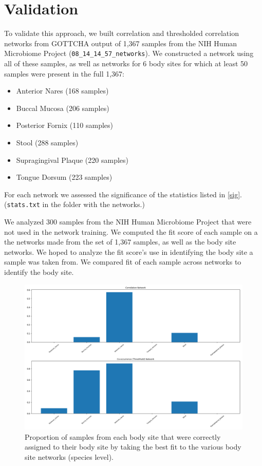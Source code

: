 \documentclass[10pt]{article}
\theoremstyle{definition}
\numberwithin{theorem}{section}
\numberwithin{definition}{section}
\numberwithin{lemma}{section}
\numberwithin{corollary}{section}
\numberwithin{clm}{section}
\numberwithin{rmk}{section}
\begin{document}
\section{Validation}

To validate this approach, we built correlation and thresholded correlation networks from GOTTCHA output of 1,367 samples from the NIH Human Microbiome Project (\verb|08_14_14_57_networks|). We constructed a network using all of these samples, as well as networks for 6 body sites for which at least 50 samples were present in the full 1,367:
\begin{itemize}
	\item Anterior Nares (168 samples) 
	\item Buccal Mucosa (206 samples)
	\item Posterior Fornix (110 samples)
	\item Stool (288 samples)
	\item Supragingival Plaque (220 samples)
	\item Tongue Dorsum (223 samples)
\end{itemize}
For each network we assessed the significance of the statistics listed in \cref{sig}. (\verb|stats.txt| in the folder with the networks.)

We analyzed 300 samples from the NIH Human Microbiome Project that were not used in the network training. We computed the fit score of each sample on a the networks made from the set of 1,367 samples, as well as the body site networks. We hoped to analyze the fit score's use in identifying the body site a sample was taken from. We compared fit of each sample across networks to identify the body site. 

\begin{figure}
	\begin{center}
	\includegraphics[scale = 0.4]{../correct_ids.png}
	\end{center}
	\caption{Proportion of samples from each body site that were correctly assigned to their body site by taking the best fit to the various body site networks (species level).}
\end{figure}
\end{document}
